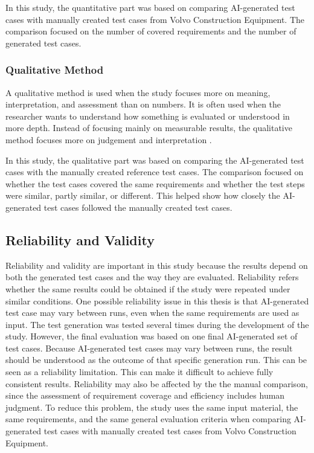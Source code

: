\documentclass[a4paper,12pt]{article}
\begin{document}
In this study, the quantitative part was based on comparing AI-generated test cases with manually created test cases from Volvo Construction Equipment. The comparison focused on the number of covered requirements and the number of generated test cases.


\subsubsection{Qualitative Method}
A qualitative method is used when the study focuses more on meaning, interpretation, and assessment than on numbers. It is often used when the researcher wants to understand how something is evaluated or understood in more depth. Instead of focusing mainly on measurable results, the qualitative method focuses more on judgement and interpretation \cite{usc_qualitative_method}.

In this study, the qualitative part was based on comparing the AI-generated test cases with the manually created reference test cases. The comparison focused on whether the test cases covered the same requirements and whether the test steps were similar, partly similar, or different. This helped show how closely the AI-generated test cases followed the manually created test cases.


\subsection{Reliability and Validity}
Reliability and validity are important in this study because the results depend on both the generated test cases and the way they are evaluated. Reliability refers whether the same results could be obtained if the study were repeated under similar conditions. One possible reliability issue in this thesis is that AI-generated test case may vary between runs, even when the same requirements are used as input. The test generation was tested several times during the development of the study. However, the final evaluation was based on one final AI-generated set of test cases. Because AI-generated test cases may vary between runs, the result should be understood as the outcome of that specific generation run. This can be seen as a reliability limitation. This can make it difficult to achieve fully consistent results. Reliability may also be affected by the the manual comparison, since the assessment of requirement coverage and efficiency includes human judgment. To  reduce this problem, the study uses the same input material, the same requirements, and the same general evaluation criteria when comparing AI-generated test cases with manually created test cases from Volvo Construction Equipment. 
\end{document}
